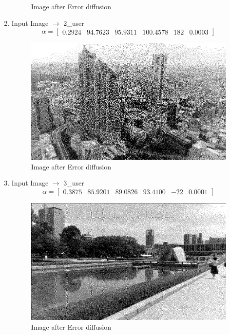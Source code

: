 \documentclass{article}
\begin{document}
\begin{enumerate}
\begin{figure}[H]
        \caption{Image after Error diffusion}
        \label{fig:Image after Error diffusion}
    \end{figure}
        \item Input Image $\longrightarrow$ 2{\_}user
        \[
    \alpha=
    \begin{bmatrix} 
      0.2924 &	94.7623 &	95.9311 &	100.4578 &	182	 & 0.0003
    \end{bmatrix}
    \]
    \begin{figure}[H]
        \centering
        \includegraphics[width=0.75\linewidth]{43.png}
        \caption{Image after Error diffusion}
        \label{fig:Image after Error diffusion}
    \end{figure}
        \item Input Image $\longrightarrow$ 3{\_}user
        \[
    \alpha=
    \begin{bmatrix} 
      0.3875 &	85.9201 &	89.0826 &	93.4100 &	-22	& 0.0001
    \end{bmatrix}
    \]
    \begin{figure}[H]
        \centering
        \includegraphics[width=0.75\linewidth]{44.png}
        \caption{Image after Error diffusion}
        \label{fig:Image after Error diffusion}
    \end{figure}
    \end{enumerate}
\end{document}
